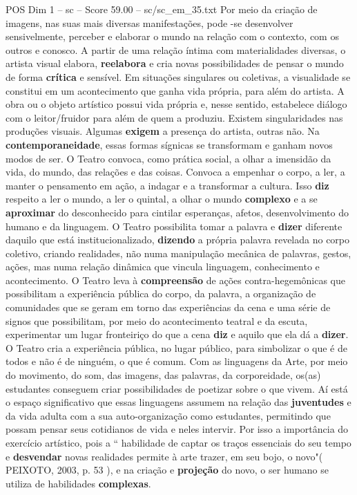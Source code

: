 \begin{textsample}{POS Dim 1 – sc – Score 59.00 – sc/sc\_em\_35.txt}
Por meio da criação de imagens, nas suas mais diversas manifestações, pode -se desenvolver sensivelmente, perceber e elaborar o mundo na relação com o contexto, com os outros e conosco.
A partir de uma relação íntima com materialidades diversas, o artista visual elabora, \textbf{reelabora} e cria novas possibilidades de pensar o mundo de forma \textbf{crítica} e sensível.
Em situações singulares ou coletivas, a visualidade se constitui em um acontecimento que ganha vida própria, para além do artista.
A obra ou o objeto artístico possui vida própria e, nesse sentido, estabelece diálogo com o leitor/fruidor para além de quem a produziu.
Existem singularidades nas produções visuais.
Algumas \textbf{exigem} a presença do artista, outras não.
Na \textbf{contemporaneidade}, essas formas sígnicas se transformam e ganham novos modos de ser.
O Teatro convoca, como prática social, a olhar a imensidão da vida, do mundo, das relações e das coisas.
Convoca a empenhar o corpo, a ler, a manter o pensamento em ação, a indagar e a transformar a cultura.
Isso \textbf{diz} respeito a ler o mundo, a ler o quintal, a olhar o mundo \textbf{complexo} e a se \textbf{aproximar} do desconhecido para cintilar esperanças, afetos, desenvolvimento do humano e da linguagem.
O Teatro possibilita tomar a palavra e \textbf{dizer} diferente daquilo que está institucionalizado, \textbf{dizendo} a própria palavra revelada no corpo coletivo, criando realidades, não numa manipulação mecânica de palavras, gestos, ações, mas numa relação dinâmica que vincula linguagem, conhecimento e acontecimento.
O Teatro leva à \textbf{compreensão} de ações contra-hegemônicas que possibilitam a experiência pública do corpo, da palavra, a organização de comunidades que se geram em torno das experiências da cena e uma série de signos que possibilitam, por meio do acontecimento teatral e da escuta, experimentar um lugar fronteiriço do que a cena \textbf{diz} e aquilo que ela dá a \textbf{dizer}.
O Teatro cria a experiência pública, no lugar público, para simbolizar o que é de todos e não é de ninguém, o que é comum.
Com as linguagens da Arte, por meio do movimento, do som, das imagens, das palavras, da corporeidade, os(as) estudantes conseguem criar possibilidades de poetizar sobre o que vivem.
Aí está o espaço significativo que essas linguagens assumem na relação das \textbf{juventudes} e da vida adulta com a sua auto-organização como estudantes, permitindo que possam pensar seus cotidianos de vida e neles intervir.
Por isso a importância do exercício artístico, pois a “ habilidade de captar os traços essenciais do seu tempo e \textbf{desvendar} novas realidades permite à arte trazer, em seu bojo, o novo"( PEIXOTO, 2003, p. 53 ), e na criação e \textbf{projeção} do novo, o ser humano se utiliza de habilidades \textbf{complexas}.

\end{textsample}
